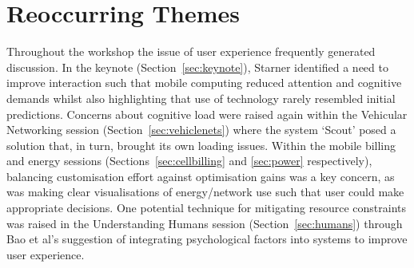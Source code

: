 \section{Reoccurring Themes}
\label{sec:keythemes}

Throughout the workshop the issue of user experience frequently generated 
discussion. In the keynote (Section~\ref{sec:keynote}), Starner identified a need 
to improve interaction such that mobile computing reduced attention and cognitive 
demands whilst also highlighting that use of technology rarely resembled initial 
predictions. Concerns about cognitive load were raised again within the Vehicular 
Networking session (Section~\ref{sec:vehiclenets}) where the system `Scout' posed 
a solution that, in turn, brought its own loading issues. Within the mobile 
billing and energy sessions (Sections~\ref{sec:cellbilling} and \ref{sec:power} 
respectively), balancing customisation effort against optimisation gains was a 
key concern, as was making clear visualisations of energy\slash network use such 
that user could make appropriate decisions. One potential technique for 
mitigating resource constraints was raised in the Understanding Humans session 
(Section~\ref{sec:humans}) through Bao et al's suggestion of integrating 
psychological factors into systems to improve user experience.





